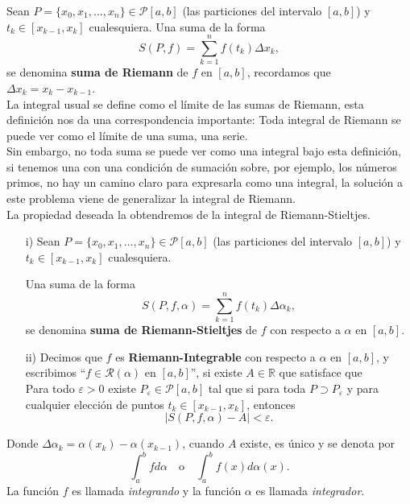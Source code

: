 Sean $P=\{x_0,x_1,...,x_n\}\in\mathcal{P}[a,b]$ (las particiones del intervalo $[a,b]$) y   $t_{k}\in [x_{k-1},x_k]$ cualesquiera. Una suma de la forma $$S(P,f)=\sum_{k=1}^{n}f(t_k)\Delta x_k,$$ se denomina \textbf{suma de Riemann} de $f$ en $[a,b]$, recordamos que $\Delta x_k=x_k-x_{k-1}$.\\

La integral usual se define como el límite de las sumas de Riemann, esta definición nos da una correspondencia importante: Toda integral de Riemann se puede ver como el límite de una suma, una serie.\\

Sin embargo, no toda suma se puede ver como una integral bajo esta definición, si tenemos una con una condición de sumación sobre, por ejemplo, los números primos, no hay un camino claro para expresarla como una integral, la solución a este problema viene de generalizar la integral de Riemann.\\

La propiedad deseada la obtendremos de la integral de Riemann-Stieltjes.

\begin{definition}
\phantom{uwu}
\begin{itemize}

    \item[i)] Sean $P=\{x_0,x_1,...,x_n\}\in\mathcal{P}[a,b]$ (las particiones del intervalo $[a,b]$) y   $t_{k}\in [x_{k-1},x_k]$ cualesquiera. 
    
    Una suma de la forma $$S(P,f,\alpha)=\sum_{k=1}^{n}f(t_k)\Delta \alpha_k,$$ se denomina \textbf{suma de Riemann-Stieltjes} de $f$ con respecto a $\alpha$ en $[a,b]$.
    
    \item[ii)] Decimos que $f$ es \textbf{Riemann-Integrable} con respecto a $\alpha$ en $[a,b]$, y escribimos ``$f\in \mathcal{R}(\alpha)$ en $[a,b]$'', si existe $A\in \mathbb R$ que satisface que\\ 
    Para todo $\varepsilon>0$ existe $P_{\varepsilon}\in \mathcal{P}[a,b]$ tal que si para toda $P\supset P_{\varepsilon}$ y para cualquier elección de puntos $t_{k}\in [x_{k-1},x_k]$, entonces $$\mid S(P,f,\alpha) - A\mid <\varepsilon.$$
    \end{itemize}
\end{definition}

Donde $\Delta\alpha_k=\alpha(x_k)-\alpha(x_{k-1})$, cuando $A$ existe, es único y se denota por $$\int_a^b fd\alpha \quad \text{o} \quad \int_{a}^{b} f(x)d\alpha(x).$$ 
La función $f$ es llamada \textit{integrando} y la función $\alpha$ es llamada \textit{integrador}.\\


